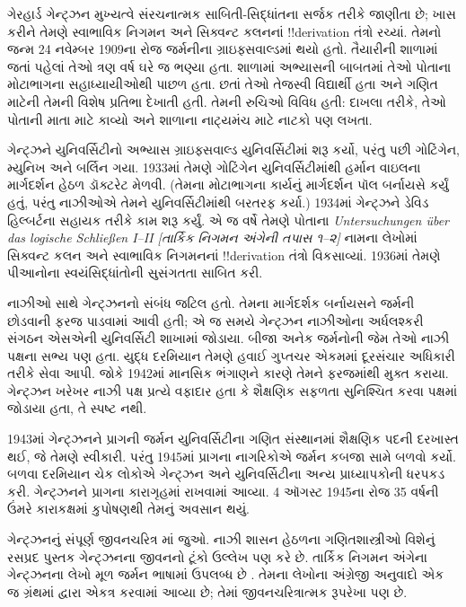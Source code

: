 \documentclass[../../../include/open-logic-section]{subfiles}
\begin{document}



ગેરહાર્ડ ગેન્ટ્ઝન મુખ્યત્વે સંરચનાત્મક સાબિતી-સિદ્ધાંતના
સર્જક તરીકે જાણીતા છે; ખાસ કરીને તેમણે સ્વાભાવિક નિગમન
અને સિક્વન્ટ કલનનાં !!{derivation} તંત્રો રચ્યાં.
તેમનો જન્મ 24 નવેમ્બર 1909ના રોજ જર્મનીના
ગ્રાઇફ્સવાલ્ડમાં થયો હતો. તૈયારીની શાળામાં જતાં પહેલાં
તેઓ ત્રણ વર્ષ ઘરે જ ભણ્યા હતા. શાળામાં અભ્યાસની બાબતમાં
તેઓ પોતાના મોટાભાગના સહાધ્યાયીઓથી પાછળ હતા.
છતાં તેઓ તેજસ્વી વિદ્યાર્થી હતા અને ગણિત માટેની
તેમની વિશેષ પ્રતિભા દેખાતી હતી. તેમની રુચિઓ વિવિધ
હતી: દાખલા તરીકે, તેઓ પોતાની માતા માટે કાવ્યો
અને શાળાના નાટ્યમંચ માટે નાટકો પણ લખતા.

ગેન્ટ્ઝને યુનિવર્સિટીનો અભ્યાસ ગ્રાઇફ્સવાલ્ડ
યુનિવર્સિટીમાં શરૂ કર્યો, પરંતુ પછી ગોટિંગેન,
મ્યુનિખ અને બર્લિન ગયા. 1933માં તેમણે ગોટિંગેન
યુનિવર્સિટીમાંથી હર્માન વાઇલના માર્ગદર્શન હેઠળ
ડૉક્ટરેટ મેળવી. (તેમના મોટાભાગના કાર્યનું
માર્ગદર્શન પૉલ બર્નાયસે કર્યું હતું, પરંતુ
નાઝીઓએ તેમને યુનિવર્સિટીમાંથી બરતરફ કર્યા.)
1934માં ગેન્ટ્ઝને ડેવિડ હિલ્બર્ટના સહાયક તરીકે
કામ શરૂ કર્યું. એ જ વર્ષે તેમણે પોતાના
\emph{Untersuchungen \"{u}ber das logische Schlie\ss en I--II
  [તાર્કિક નિગમન અંગેની તપાસ ૧--૨]} નામના
લેખોમાં સિક્વન્ટ કલન અને સ્વાભાવિક નિગમનનાં
!!{derivation} તંત્રો વિકસાવ્યાં. 1936માં
તેમણે પીઆનોના સ્વયંસિદ્ધાંતોની સુસંગતતા સાબિત કરી.

નાઝીઓ સાથે ગેન્ટ્ઝનનો સંબંધ જટિલ હતો.
તેમના માર્ગદર્શક બર્નાયસને જર્મની છોડવાની
ફરજ પાડવામાં આવી હતી; એ જ સમયે ગેન્ટ્ઝન
નાઝીઓના અર્ધલશ્કરી સંગઠન એસએની યુનિવર્સિટી
શાખામાં જોડાયા. બીજા અનેક જર્મનોની જેમ
તેઓ નાઝી પક્ષના સભ્ય પણ હતા. યુદ્ધ દરમિયાન
તેમણે હવાઈ ગુપ્તચર એકમમાં દૂરસંચાર અધિકારી
તરીકે સેવા આપી. જોકે 1942માં માનસિક ભંગાણને
કારણે તેમને ફરજમાંથી મુક્ત કરાયા. ગેન્ટ્ઝન
ખરેખર નાઝી પક્ષ પ્રત્યે વફાદાર હતા કે
શૈક્ષણિક સફળતા સુનિશ્ચિત કરવા પક્ષમાં
જોડાયા હતા, તે સ્પષ્ટ નથી.

1943માં ગેન્ટ્ઝનને પ્રાગની જર્મન યુનિવર્સિટીના
ગણિત સંસ્થાનમાં શૈક્ષણિક પદની દરખાસ્ત થઈ,
જે તેમણે સ્વીકારી. પરંતુ 1945માં પ્રાગના
નાગરિકોએ જર્મન કબજા સામે બળવો કર્યો.
બળવા દરમિયાન ચેક લોકોએ ગેન્ટ્ઝન અને યુનિવર્સિટીના
અન્ય પ્રાધ્યાપકોની ધરપકડ કરી. ગેન્ટ્ઝનને
પ્રાગના કારાગૃહમાં રાખવામાં આવ્યા.
4 ઑગસ્ટ 1945ના રોજ 35 વર્ષની ઉંમરે
કારાકક્ષમાં કુપોષણથી તેમનું અવસાન થયું.


\begin{reading}
ગેન્ટ્ઝનનું સંપૂર્ણ જીવનચરિત્ર \citet{Menzler-Trott2007}માં
જુઓ. નાઝી શાસન હેઠળના ગણિતશાસ્ત્રીઓ વિશેનું
રસપ્રદ પુસ્તક \citet{Segal2014} ગેન્ટ્ઝનના
જીવનનો ટૂંકો ઉલ્લેખ પણ કરે છે.
તાર્કિક નિગમન અંગેના ગેન્ટ્ઝનના લેખો મૂળ
જર્મન ભાષામાં ઉપલબ્ધ છે
\citep{Gentzen1935a,Gentzen1935b}. તેમના લેખોના
અંગ્રેજી અનુવાદો એક જ ગ્રંથમાં
\citet{Gentzen1969} દ્વારા એકત્ર કરવામાં આવ્યા છે;
તેમાં જીવનચરિત્રાત્મક રૂપરેખા પણ છે.
\end{reading}
\end{document}
